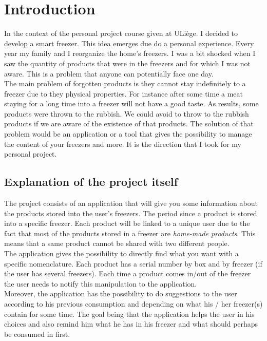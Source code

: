\section{Introduction}
In the context of the personal project course given at ULiège. I decided to develop a smart freezer. This idea emerges due do a personal experience. Every year my family and I reorganize the home's freezers. I was a bit shocked when I saw the quantity of products that were in the freezers and for which I was not aware. This is a problem that anyone can potentially face one day. \\

The main problem of forgotten products is they cannot stay indefinitely to a freezer due to they physical properties. For instance after some time a meat staying for a long time into a freezer will not have a good taste. As results, some products were thrown to the rubbish. We could avoid to throw to the rubbish products if we are aware of the existence of that products. The solution of that problem would be an application or a tool that gives the possibility to manage the content of your freezers and more. It is the direction that I took for my personal project.

\subsection{Explanation of the project itself}
The project consists of an application that will give you some information about the products stored into the user's freezers. The period since a product is stored into a specific freezer. Each product will be linked to a unique user due to the fact that most of the products stored in a freezer are \textit{home-made products}. This means that a same product cannot be shared with two different people.\\

The application gives the possibility to directly find what you want with a specific nomenclature. Each product has a serial number by box and by freezer (if the user has several freezers). Each time a product comes in/out of the freezer the user needs to notify this manipulation to the application.\\

Moreover, the application has the possibility to do suggestions to the user according to his previous consumption and depending on what his / her freezer(s) contain for some time. The goal being that the application helps the user in his choices and also remind him what he has in his freezer and what should perhaps be consumed in first. \\

